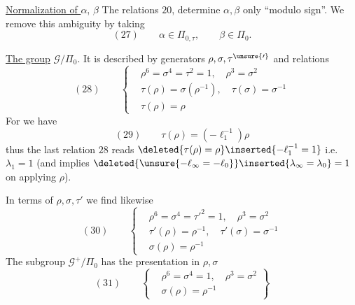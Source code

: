 \uline{Normalization of $\alpha$}, $\beta$\quad
The relations $20$, determine $\alpha,\beta$ only ``modulo sign''.
We remove this ambiguity by taking
\[
(27)\qquad
\alpha\in\Pi_{0,\tau},\qquad\beta\in\Pi_0.
\]

\uline{The group} $\mathcal G/\Pi_0$.
It is described by generators $\rho,\sigma,\tau^{\unsure{\prime}}$ and relations 
\[
(28)\qquad
\left\{
\begin{aligned}
&\rho^6=\sigma^4=\tau^2=1,\quad \rho^3=\sigma^2\\
&\tau(\rho)=\sigma(\rho^{-1}),\quad \tau(\sigma)=\sigma^{-1}\\
&\tau(\rho)=\rho
\end{aligned}
\right.
\]
For we have
\[
(29)\qquad
\tau(\rho)=(-\ell_1^{-1})\rho
\]
thus the last relation $28$ reads
$\deleted{\tau(\rho)=\rho}\inserted{-\ell_1^{-1}=1}$
i.e. $\lambda_1=1$
(and implies
$\deleted{\unsure{-\ell_\infty=-\ell_0}}\inserted{\lambda_\infty=\lambda_0}=1$
on applying $\rho$).




In terms of $\rho,\sigma,\tau'$ we find likewise
\[
(30)\qquad
\left\{
\begin{aligned}
&\rho^6=\sigma^4=\tau'^2=1,\quad \rho^3=\sigma^2\\
&\tau'(\rho)=\rho^{-1},\quad\tau'(\sigma)=\sigma^{-1}\\
&\sigma(\rho)=\rho^{-1}
\end{aligned}
\right.
\]
The subgroup $\mathcal G^+/\Pi_0$ has the presentation in $\rho,\sigma$
\[
(31)\qquad
\left\{
\begin{aligned}
&\rho^6=\sigma^4=1,\quad \rho^3=\sigma^2\\
&\sigma(\rho)=\rho^{-1}
\end{aligned}
\right\}
\]

